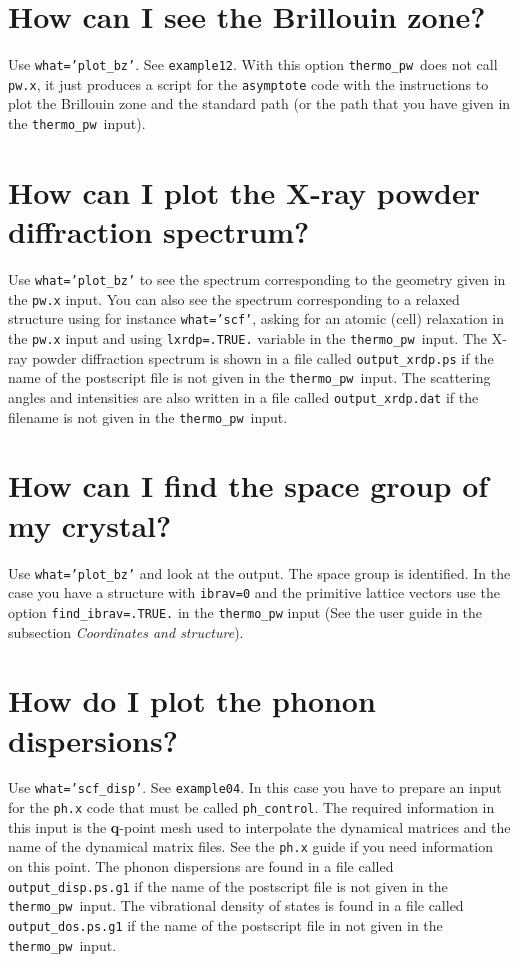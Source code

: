 \documentclass[12pt,a4paper]{article}
\def\thermo{\texttt{thermo\_pw}}
\begin{document}
\section{\color{coral}How can I see the Brillouin zone?}
Use \texttt{what='plot\_bz'}. See \texttt{example12}. With this option
\thermo\ does not call \texttt{pw.x}, it just produces a script for
the \texttt{asymptote} code with the instructions to plot the Brillouin
zone and the standard path (or the path that you have given in the \thermo\ 
input).

\section{\color{coral}How can I plot the X-ray powder diffraction spectrum?}
Use \texttt{what='plot\_bz'} to see the spectrum corresponding to
the geometry given in the \texttt{pw.x} input. You can also see the
spectrum corresponding to a relaxed structure using for instance
\texttt{what='scf'}, asking for an atomic (cell) relaxation in the \texttt{pw.x}
input and using \texttt{lxrdp=.TRUE.} variable in the \thermo\ input.
The X-ray powder diffraction spectrum is shown in a file called 
\texttt{output\_xrdp.ps} if the name of the postscript file is not
given in the \thermo\ input. The scattering angles and intensities
are also written in a file called \texttt{output\_xrdp.dat} if the filename
is not given in the \thermo\ input.

\section{\color{coral}How can I find the space group of my crystal?}
Use \texttt{what='plot\_bz'} and look at the output. The space group is
identified. In the case you have a structure with \texttt{ibrav=0} and
the primitive lattice vectors use the option \texttt{find\_ibrav=.TRUE.} 
in the \texttt{thermo\_pw} input (See the user guide in the subsection
{\it Coordinates and structure}).

\section{\color{coral}How do I plot the phonon dispersions?}
Use \texttt{what='scf\_disp'}. See \texttt{example04}. In this case you
have to prepare an input for the \texttt{ph.x} code that must be
called \texttt{ph\_control}. The required information in this input
is the {\bf q}-point mesh used to interpolate the dynamical matrices and
the name of the dynamical matrix files.
See the \texttt{ph.x} guide if you need information on this point.
The phonon dispersions are found in a file called \texttt{output\_disp.ps.g1}
if the name of the postscript file is not given in the \thermo\ input.
The vibrational density of states is found in a file called 
\texttt{output\_dos.ps.g1} if the name of the postscript file in not
given in the \thermo\ input.
\end{document}
